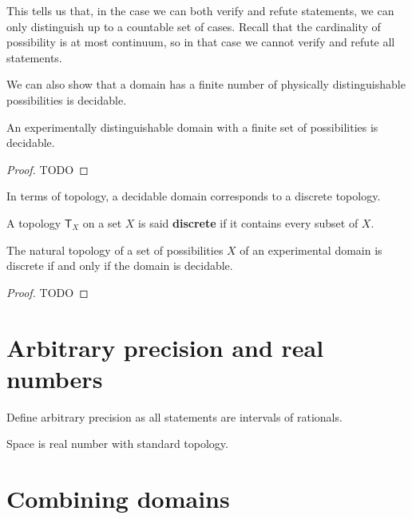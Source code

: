 \documentclass[11pt,letterpaper,fleqn]{memoir} %
\begin{document}
This tells us that, in the case we can both verify and refute statements, we can only distinguish up to a countable set of cases. Recall that the cardinality of possibility is at most continuum, so in that case we cannot verify and refute all statements.

We can also show that a domain has a finite number of physically distinguishable possibilities is decidable.

\begin{mathSection}
	
	\begin{prop}
		An experimentally distinguishable domain with a finite set of possibilities is decidable.
	\end{prop}
	
	\begin{proof}
		TODO
	\end{proof}
	
\end{mathSection}

In terms of topology, a decidable domain corresponds to a discrete topology.

\begin{mathSection}
	
	\begin{defn}
		A topology $\mathsf{T}_X$ on a set $X$ is said \textbf{discrete} if it contains every subset of $X$.
	\end{defn}
	
	\begin{prop}
		The natural topology of a set of possibilities $X$ of an experimental domain is discrete if and only if the domain is decidable.
	\end{prop}
	
	\begin{proof}
		TODO
	\end{proof}	
\end{mathSection}

\section{Arbitrary precision and real numbers}

Define arbitrary precision as all statements are intervals of rationals.

Space is real number with standard topology.

\section{Combining domains}
\end{document}
